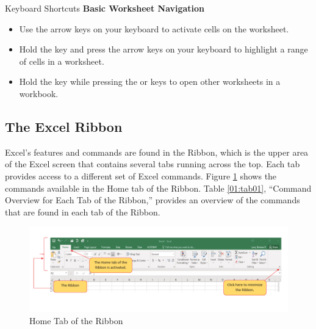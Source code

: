 \begin{center}
	\begin{shtcutbox}{Keyboard Shortcuts}
		\textbf{Basic Worksheet Navigation}
		\\
		\begin{itemize}
			\setlength{\itemsep}{0pt}
			\setlength{\parskip}{0pt}
			\setlength{\parsep}{0pt}

			\item Use the arrow keys on your keyboard to activate cells on the worksheet.
			\item Hold the  key and press the arrow keys on your keyboard to highlight a range of cells in a worksheet.
			\item Hold the  key while pressing the  or  keys to open other worksheets in a workbook.

		\end{itemize}
	\end{shtcutbox}
\end{center}

\subsection{The Excel Ribbon}

Excel's features and commands are found in the Ribbon, which is the upper area of the Excel screen that contains several tabs running across the top. Each tab provides access to a different set of Excel commands. Figure \ref{01:fig06} shows the commands available in the Home tab of the Ribbon. Table \ref{01:tab01}, ``Command Overview for Each Tab of the Ribbon,'' provides an overview of the commands that are found in each tab of the Ribbon.

\begin{figure}[H]
	\centering
	\includegraphics[width=\maxwidth{.95\linewidth}]{gfx/ch01_fig06}
	\caption{Home Tab of the Ribbon}
	\label{01:fig06}
\end{figure}

